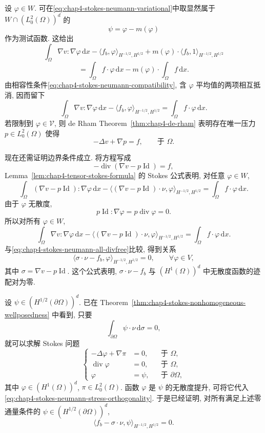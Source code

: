 \begin{Proof}
设 $\varphi\in W$. 可在\eqref{eq:chap4-stokes-neumann-variational}中取显然属于 $W\cap(L_0^2(\Omega))^d$ 的
\[
 \psi=\varphi-m(\varphi)
\]
作为测试函数. 这给出
\[
 \int_\Omega\nabla v:\nabla\varphi\,\mathrm dx
 -\langle f_b,\varphi\rangle_{H^{-1/2},H^{1/2}}
 +m(\varphi)\cdot\langle f_b,1\rangle_{H^{-1/2},H^{1/2}}
\]
\[
 =\int_\Omega f\cdot\varphi\,\mathrm dx
 -m(\varphi)\cdot\int_\Omega f\,\mathrm dx.
\]
由相容性条件\eqref{eq:chap4-stokes-neumann-compatibility}, 含 $\varphi$ 平均值的两项相互抵消, 因而留下
\begin{equation}
 \int_\Omega\nabla v:\nabla\varphi\,\mathrm dx
 -\langle f_b,\varphi\rangle_{H^{-1/2},H^{1/2}}
 =\int_\Omega f\cdot\varphi\,\mathrm dx.
 \label{eq:chap4-stokes-neumann-all-divfree}
\end{equation}
若限制到 $\varphi\in\mathcal V$, 则 de Rham Theorem~\ref{thm:chap4-de-rham} 表明存在唯一压力 $p\in L_0^2(\Omega)$ 使得
\[
 -\Delta v+\nabla p=f,\qquad\text{于 }\Omega.
\]

现在还需证明边界条件成立. 将方程写成
\[
 -\operatorname{div}(\nabla v-p\operatorname{Id})=f,
\]
Lemma~\ref{lem:chap4-tensor-stokes-formula} 的 Stokes 公式表明, 对任意 $\varphi\in W$,
\[
 \int_\Omega(\nabla v-p\operatorname{Id}):\nabla\varphi\,\mathrm dx
 -\langle(\nabla v-p\operatorname{Id})\cdot\nu,\varphi\rangle_{H^{-1/2},H^{1/2}}
 =\int_\Omega f\cdot\varphi\,\mathrm dx.
\]
由于 $\varphi$ 无散度,
\[
 p\operatorname{Id}:\nabla\varphi=p\operatorname{div}\varphi=0.
\]
所以对所有 $\varphi\in W$,
\[
 \int_\Omega\nabla v:\nabla\varphi\,\mathrm dx
 -\langle(\nabla v-p\operatorname{Id})\cdot\nu,\varphi\rangle_{H^{-1/2},H^{1/2}}
 =\int_\Omega f\cdot\varphi\,\mathrm dx.
\]
与\eqref{eq:chap4-stokes-neumann-all-divfree}比较, 得到关系
\begin{equation}
 \langle\sigma\cdot\nu-f_b,\varphi\rangle_{H^{-1/2},H^{1/2}}=0,
 \qquad\forall\varphi\in V,
 \label{eq:chap4-stokes-neumann-stress-orthogonality}
\end{equation}
其中 $\sigma=\nabla v-p\operatorname{Id}$. 这个公式表明, $\sigma\cdot\nu-f_b$ 与 $(H^1(\Omega))^d$ 中无散度函数的迹配对为零.

设 $\psi\in(H^{1/2}(\partial\Omega))^d$. 已在 Theorem~\ref{thm:chap4-stokes-nonhomogeneous-wellposedness} 中看到, 只要
\[
 \int_{\partial\Omega}\psi\cdot\nu\,\mathrm d\sigma=0,
\]
就可以求解 Stokes 问题
\[
 \left\{
 \begin{aligned}
  -\Delta\varphi+\nabla\pi&=0,&&\text{于 }\Omega,\\
  \operatorname{div}\varphi&=0,&&\text{于 }\Omega,\\
  \varphi&=\psi,&&\text{于 }\partial\Omega,
 \end{aligned}
 \right.
\]
其中 $\varphi\in(H^1(\Omega))^d$, $\pi\in L_0^2(\Omega)$. 函数 $\varphi$ 是 $\psi$ 的无散度提升, 可将它代入\eqref{eq:chap4-stokes-neumann-stress-orthogonality}. 于是已经证明, 对所有满足上述零通量条件的 $\psi\in(H^{1/2}(\partial\Omega))^d$,
\begin{equation}
 \langle f_b-\sigma\cdot\nu,\psi\rangle_{H^{-1/2},H^{1/2}}=0.
 \label{eq:chap4-stokes-neumann-zero-flux-duality}
\end{equation}


\end{Proof}
